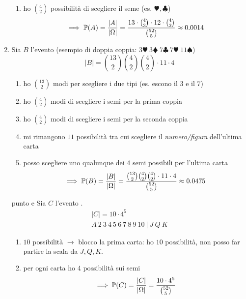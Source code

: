 \begin{enumerate}
\begin{enumerate}
		\item ho $\binom{4}{2}$ possibilità di scegliere il seme (es. $\varheartsuit ,\clubsuit $)
		\begin{equation*}
			\implies \mathbb{P}(A) =\frac{| A| }{| \Omega | } =\frac{13\cdot \binom{4}{3} \cdot 12\cdot \binom{4}{2}}{\binom{52}{5}} \approx 0.0014
		\end{equation*}
	\end{enumerate}
	\item Sia $B$ l'evento  (esempio di doppia coppia: $3\varheartsuit \ 3\vardiamondsuit \ 7\clubsuit \ 7\varheartsuit \ 11\spadesuit $)
	\begin{equation*}
		| B| =\binom{13}{2}\binom{4}{2}\binom{4}{2} \cdot 11\cdot 4
	\end{equation*}
	\begin{enumerate}
		\item ho $\binom{13}{2}$ modi per scegliere i due tipi (es. escono il $3$ e il $7$)
		\item ho $\binom{4}{2}$ modi di scegliere i semi per la prima coppia
		\item ho $\binom{4}{2}$ modi di scegliere i semi per la seconda coppia
		\item mi rimangono $11$ possibilità tra cui scegliere il \textit{numero/figura} dell'ultima carta
		\item posso scegliere uno qualunque dei $4$ semi possibili per l'ultima carta
		\begin{equation*}
			\implies \mathbb{P}(B) =\frac{| B| }{| \Omega | } =\frac{\binom{13}{2}\binom{4}{2}\binom{4}{2} \cdot 11\cdot 4}{\binom{52}{5}} \approx 0.0475
		\end{equation*}
	\end{enumerate}
	\item [punto e] Sia $C$ l'evento .
	\begin{gather*}
		| C| =10\cdot 4^{5}\\
		A\ 2\ 3\ 4\ 5\ 6\ 7\ 8\ 9\ 10\ |\ J\ Q\ K
	\end{gather*}
	\begin{enumerate}
		\item $10$ possibilità $\rightarrow $ blocco la prima carta: ho $10$ possibilità, non posso far partire la scala da $J,Q,K$.
		\item per ogni carta ho $4$ possibilità sui semi
		\begin{equation*}
			\implies \mathbb{P}(C) =\frac{| C| }{| \Omega | } =\frac{10\cdot 4^{5}}{\binom{52}{5}}
		\end{equation*}

\end{enumerate}
\end{enumerate}

